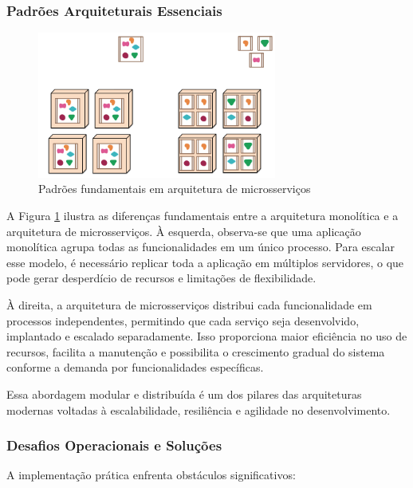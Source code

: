 \subsubsection{Padrões Arquiteturais Essenciais}
\begin{figure}[H]
\centering
\includegraphics[width=0.7\textwidth]{images/microservice.png}
\caption{Padrões fundamentais em arquitetura de microsserviços}
\label{fig:micro_patterns}
\end{figure}

A Figura \ref{fig:micro_patterns} ilustra as diferenças fundamentais entre a arquitetura monolítica e a arquitetura de microsserviços. À esquerda, observa-se que uma aplicação monolítica agrupa todas as funcionalidades em um único processo. Para escalar esse modelo, é necessário replicar toda a aplicação em múltiplos servidores, o que pode gerar desperdício de recursos e limitações de flexibilidade.

À direita, a arquitetura de microsserviços distribui cada funcionalidade em processos independentes, permitindo que cada serviço seja desenvolvido, implantado e escalado separadamente. Isso proporciona maior eficiência no uso de recursos, facilita a manutenção e possibilita o crescimento gradual do sistema conforme a demanda por funcionalidades específicas.

Essa abordagem modular e distribuída é um dos pilares das arquiteturas modernas voltadas à escalabilidade, resiliência e agilidade no desenvolvimento.

\subsubsection{Desafios Operacionais e Soluções}
A implementação prática enfrenta obstáculos significativos:


